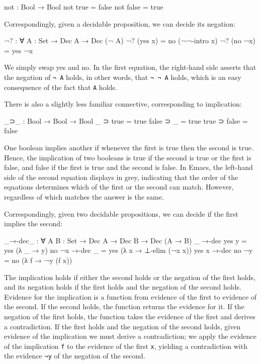 \begin{fence}
\begin{code}
not : Bool → Bool
not true  = false
not false = true
\end{code}
\end{fence}

Correspondingly, given a decidable proposition, we can decide its
negation:

\begin{fence}
\begin{code}
¬? : ∀ {A : Set} → Dec A → Dec (¬ A)
¬? (yes x)  =  no (¬¬-intro x)
¬? (no ¬x)  =  yes ¬x
\end{code}
\end{fence}

We simply swap yes and no. In the first equation, the right-hand side
asserts that the negation of \texttt{¬\ A} holds, in other words, that
\texttt{¬\ ¬\ A} holds, which is an easy consequence of the fact that
\texttt{A} holds.

There is also a slightly less familiar connective, corresponding to
implication:

\begin{fence}
\begin{code}
_⊃_ : Bool → Bool → Bool
_     ⊃ true   =  true
false ⊃ _      =  true
true  ⊃ false  =  false
\end{code}
\end{fence}

One boolean implies another if whenever the first is true then the
second is true. Hence, the implication of two booleans is true if the
second is true or the first is false, and false if the first is true and
the second is false. In Emacs, the left-hand side of the second equation
displays in grey, indicating that the order of the equations determines
which of the first or the second can match. However, regardless of which
matches the answer is the same.

Correspondingly, given two decidable propositions, we can decide if the
first implies the second:

\begin{fence}
\begin{code}
_→-dec_ : ∀ {A B : Set} → Dec A → Dec B → Dec (A → B)
_     →-dec yes y  =  yes (λ _ → y)
no ¬x →-dec _      =  yes (λ x → ⊥-elim (¬x x))
yes x →-dec no ¬y  =  no (λ f → ¬y (f x))
\end{code}
\end{fence}

The implication holds if either the second holds or the negation of the
first holds, and its negation holds if the first holds and the negation
of the second holds. Evidence for the implication is a function from
evidence of the first to evidence of the second. If the second holds,
the function returns the evidence for it. If the negation of the first
holds, the function takes the evidence of the first and derives a
contradiction. If the first holds and the negation of the second holds,
given evidence of the implication we must derive a contradiction; we
apply the evidence of the implication \texttt{f} to the evidence of the
first \texttt{x}, yielding a contradiction with the evidence \texttt{¬y}
of the negation of the second.

